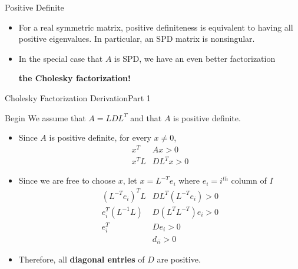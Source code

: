 \documentclass[10pt]{beamer}
\begin{document}
\begin{frame}{Positive Definite}

\begin{itemize}

    {} \vspace{3mm}

\item For a real symmetric matrix, positive definiteness
is equivalent to having all positive eigenvalues.
In particular, an SPD matrix is nonsingular.

    \item In the special case that $A$ is SPD, we have an even better factorization
    \vspace{3mm}
    \begin{center}
        \textbf{the Cholesky factorization!}
    \end{center}

\end{itemize}
\end{frame}
\begin{frame}{Cholesky Factorization Derivation}{Part 1}

\begin{block}{Begin}
We assume that $A = LDL^T$ and that $A$ is positive definite. 
\end{block}

\begin{itemize}

\item Since $A$ is positive definite, for every $x\ne 0$,
        \begin{align*}
        x^T&Ax >0\\ 
        x^T L&DL^T x > 0
        \end{align*}
\item Since we are free to choose $x$, let $x = L^{-T}e_i$ where $e_i=i^{th}$ column of $I$
        \begin{align*}
        (L^{-T}e_i)^T L&DL^T (L^{-T}e_i) > 0\\
        e_i^T (L^{-1} L)&D(L^T L^{-T})e_i > 0\\
        e_i^T&D e_i > 0\\
           &d_{ii} > 0
        \end{align*}

\item Therefore, all \textbf{diagonal entries} of $D$ are positive.

\end{itemize}
\end{frame}
\end{document}
